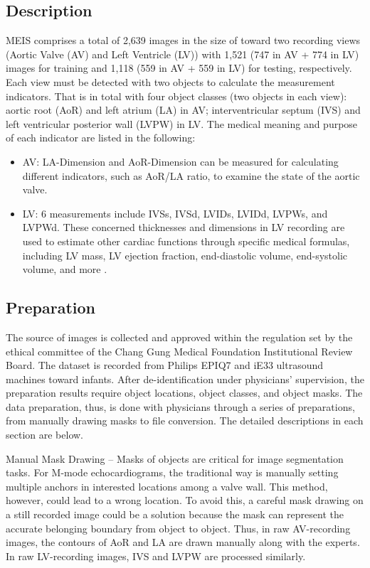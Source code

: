 \documentclass{article}
\begin{document}
\subsection{Description}
\label{sec3.1}
MEIS comprises a total of 2,639 images in the size of  toward two recording views (Aortic Valve (AV) and Left Ventricle (LV)) with 1,521 (747 in AV + 774 in LV) images for training and 1,118 (559 in AV + 559 in LV) for testing, respectively. Each view must be detected with two objects to calculate the measurement indicators.  That is in total with four object classes (two objects in each view):  aortic root (AoR) and left atrium (LA) in AV; interventricular septum (IVS) and left ventricular posterior wall (LVPW) in LV. The medical meaning and purpose of each indicator are listed in the following:
\begin{itemize}
\item AV: LA-Dimension and AoR-Dimension can be measured for calculating different indicators, such as AoR/LA ratio, to examine the state of the aortic valve.
\item LV: 6 measurements include IVSs, IVSd, LVIDs, LVIDd, LVPWs, and LVPWd. These concerned thicknesses and dimensions in LV recording are used to estimate other cardiac functions through specific medical formulas, including LV mass, LV ejection fraction, end-diastolic volume, end-systolic volume, and more \cite{wandt1999echocardiographic}\cite{mizukoshi2016normal}.
\end{itemize}

\subsection{Preparation}
\label{sec3.2}
The source of images is collected and approved within the regulation set by the ethical committee of the Chang Gung Medical Foundation Institutional Review Board. The dataset is recorded from Philips EPIQ7 and iE33 ultrasound machines toward infants. After de-identification under physicians’ supervision, the preparation results require object locations, object classes, and object masks. The data preparation, thus, is done with physicians through a series of preparations, from manually drawing masks to file conversion. The detailed descriptions in each section are below.

Manual Mask Drawing – Masks of objects are critical for image segmentation tasks. For M-mode echocardiograms, the traditional way is manually setting multiple anchors in interested locations among a valve wall. This method, however, could lead to a wrong location. To avoid this, a careful mask drawing on a still recorded image could be a solution because the mask can represent the accurate belonging boundary from object to object. Thus, in raw AV-recording images, the contours of AoR and LA are drawn manually along with the experts. In raw LV-recording images, IVS and LVPW are processed similarly. 
\end{document}

